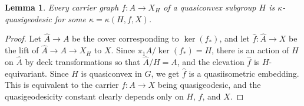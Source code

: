 \documentclass[article, 12pt]{amsart}
\numberwithin{equation}{section}
\newtheorem{lemma}[theorem]{Lemma}
\theoremstyle{definition}
\newtheorem{definition}[theorem]{Definition}
\newcommand{\tild}[1]{\widetilde{#1}}
\DeclareMathOperator{\diam}{diam}
\DeclareMathOperator{\bdelta}{\boldsymbol{\delta}}
\begin{document}
\begin{lemma}\label{stupid quasiconvexity bound}
Every carrier graph $f:A\to X_H$ of a quasiconvex subgroup $H$ is $\kappa$-quasigeodesic for some $\kappa=\kappa(H,f,X)$.
\end{lemma}
\begin{proof}
    Let $\hat A\to A$ be the cover corresponding to $\ker(f_*)$, and let $\hat f:\hat A\to X$ be the lift of $\hat A\to A\to X_H$ to $X$. 
    Since $\pi_1A/\ker(f_*)=H$, there is an action of $H$ on $\hat A$ by deck transformations so that $\hat A/H=A$, and the elevation $\hat f$ is $H$-equivariant.
    Since $H$ is quasiconvex in $G$, we get $\hat f$ is a quasiisometric embedding.
    This is equivalent to the carrier $f:A\to X$ being quasigeodesic, and the quasigeodesicity constant clearly depends only on $H$, $f$, and $X$.
\end{proof}





\end{document}
